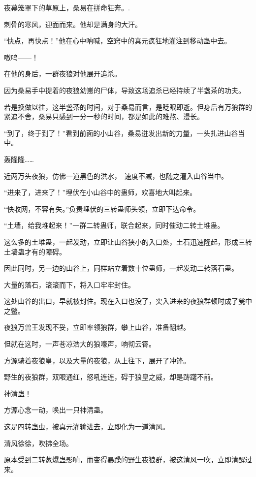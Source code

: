 
\begin{this_body}

夜幕笼罩下的草原上，桑易在拼命狂奔。.

刺骨的寒风，迎面而来。他却是满身的大汗。

“快点，再快点！”他在心中呐喊，空窍中的真元疯狂地灌注到移动蛊中去。

嗷呜——！

在他的身后，一群夜狼对他展开追杀。

因为桑易手中提着的夜狼幼崽的尸体，导致这场追杀已经持续了半盏茶的功夫。

若是换做以往，这半盏茶的时间，对于桑易而言，是眨眼即逝。但身后有万狼群的紧追不舍，桑易只感到一分一秒的时间，都是如此的难熬、漫长。

“到了，终于到了！”看到前面的小山谷，桑易迸发出新的力量，一头扎进山谷当中。

轰隆隆……

近两万头夜狼，仿佛一道黑色的洪水，　速度不减，也随之灌入山谷当中。

“进来了，进来了！”埋伏在小山谷中的蛊师，欢喜地大叫起来。

“快收网，不容有失。”负责埋伏的三转蛊师头领，立即下达命令。

“土墙，给我堆起来！”一群二转蛊师，联合起来，同时催动二转土堆蛊。

这么多的土堆蛊，一起发动，立即让山谷狭小的入口处，土石迅速隆起，形成三转土墙蛊才有的障碍。

因此同时，另一边的山谷上，同样站立着数十位蛊师，一起发动二转落石蛊。

大量的落石，滚滚而下，将入口牢牢封住。

这处山谷的出口，早就被封住。现在入口也没了，突入进来的夜狼群顿时成了瓮中之鳖。

夜狼万兽王发现不妥，立即率领狼群，攀上山谷，准备翻越。

但就在这时，一声苍凉浩大的狼嚎声，响彻云霄。

方源骑着夜狼皇，以及大量的夜狼，从上往下，展开了冲锋。

野生的夜狼群，双眼通红，怒吼连连，碍于狼皇之威，却是踌躇不前。

神清蛊！

方源心念一动，唤出一只神清蛊。

这是四转蛊虫，被真元灌输进去，立即化为一道清风。

清风徐徐，吹拂全场。

原本受到二转葱爆蛊影响，而变得暴躁的野生夜狼群，被这清风一吹，立即清醒过来。


\end{this_body}
